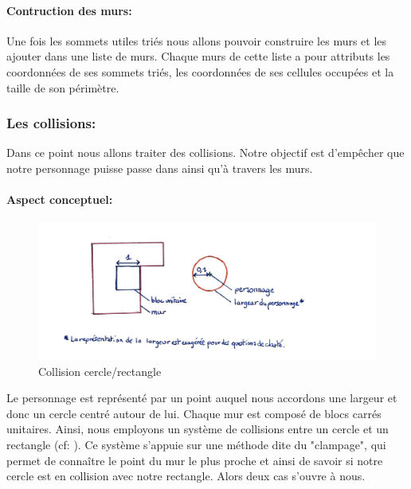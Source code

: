 \documentclass[11pt]{article}
\begin{document}
\paragraph{Contruction des murs:}
Une fois les sommets utiles triés nous allons pouvoir construire les murs et les ajouter dans une liste de murs. Chaque murs de cette liste a pour attributs les coordonnées de ses sommets triés, les coordonnées de ses cellules occupées et la taille de son périmètre.

\subsubsection{Les collisions:}

Dans ce point nous allons traiter des collisions. Notre objectif est d'empêcher
que notre personnage puisse passe dans ainsi qu'à travers les murs.

\paragraph{Aspect conceptuel:}

\begin{figure}
	\centering
	\includegraphics[width=1\textwidth]{image/fig1.jpg}
	\caption{Collision cercle/rectangle}
	\label{fig:collision_cercle_rectangle}
\end{figure}

Le personnage est représenté par un point auquel nous accordons une 
largeur et donc un cercle centré autour de lui. Chaque mur est composé de 
blocs carrés unitaires. Ainsi, nous employons un système de collisions 
entre un cercle et un rectangle (cf: ). 
Ce système s'appuie sur une méthode dite du "clampage", qui permet de connaître le point du mur le plus proche 
et ainsi de savoir si notre cercle est en collision avec notre rectangle.
Alors deux cas s'ouvre à nous.
\end{document}
